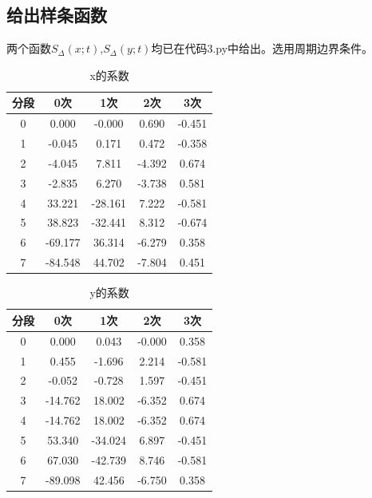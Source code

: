 \documentclass{article}
\numberwithin{equation}{section}
\numberwithin{table}{section}
\begin{document}
\subsection{给出样条函数}
两个函数$S_\Delta\left(x;t\right)$,$S_\Delta\left(y;t\right)$均已在代码3.py中给出。选用周期边界条件。
\begin{table}[H]
    \centering
    \caption{x的系数}
    \begin{tabular}{ccccc}
        \toprule
        分段 & 0次     & 1次     & 2次    & 3次    \\
        \midrule
        0    & 0.000   & -0.000  & 0.690  & -0.451 \\
        1    & -0.045  & 0.171   & 0.472  & -0.358 \\
        2    & -4.045  & 7.811   & -4.392 & 0.674  \\
        3    & -2.835  & 6.270   & -3.738 & 0.581  \\
        4    & 33.221  & -28.161 & 7.222  & -0.581 \\
        5    & 38.823  & -32.441 & 8.312  & -0.674 \\
        6    & -69.177 & 36.314  & -6.279 & 0.358  \\
        7    & -84.548 & 44.702  & -7.804 & 0.451  \\
        \bottomrule
    \end{tabular}
\end{table}
\begin{table}[H]
    \centering
    \caption{y的系数}
    \begin{tabular}{ccccc}
        \toprule
        分段 & 0次     & 1次     & 2次    & 3次    \\
        \midrule
        0    & 0.000   & 0.043   & -0.000 & 0.358  \\
        1    & 0.455   & -1.696  & 2.214  & -0.581 \\
        2    & -0.052  & -0.728  & 1.597  & -0.451 \\
        3    & -14.762 & 18.002  & -6.352 & 0.674  \\
        4    & -14.762 & 18.002  & -6.352 & 0.674  \\
        5    & 53.340  & -34.024 & 6.897  & -0.451 \\
        6    & 67.030  & -42.739 & 8.746  & -0.581 \\
        7    & -89.098 & 42.456  & -6.750 & 0.358  \\
        \bottomrule
    \end{tabular}
\end{table}
\end{document}
